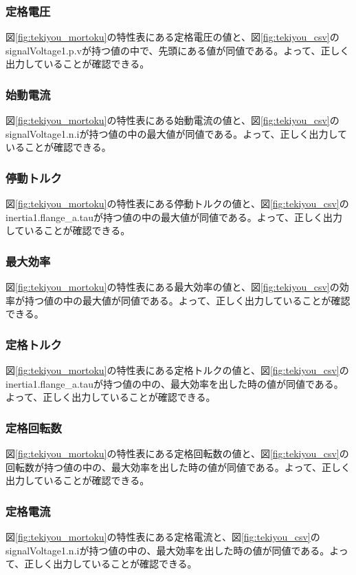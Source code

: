 \subsubsection{定格電圧}
図\ref{fig:tekiyou_mortoku}の特性表にある定格電圧の値と、図\ref{fig:tekiyou_csv}のsignalVoltage1.p.vが持つ値の中で、先頭にある値が同値である。よって、正しく出力していることが確認できる。
\subsubsection{始動電流}
図\ref{fig:tekiyou_mortoku}の特性表にある始動電流の値と、図\ref{fig:tekiyou_csv}のsignalVoltage1.n.iが持つ値の中の最大値が同値である。よって、正しく出力していることが確認できる。
\subsubsection{停動トルク}
図\ref{fig:tekiyou_mortoku}の特性表にある停動トルクの値と、図\ref{fig:tekiyou_csv}のinertia1.flange\_a.tauが持つ値の中の最大値が同値である。よって、正しく出力していることが確認できる。
\subsubsection{最大効率}
図\ref{fig:tekiyou_mortoku}の特性表にある最大効率の値と、図\ref{fig:tekiyou_csv}の効率が持つ値の中の最大値が同値である。よって、正しく出力していることが確認できる。
\subsubsection{定格トルク}
図\ref{fig:tekiyou_mortoku}の特性表にある定格トルクの値と、図\ref{fig:tekiyou_csv}のinertia1.flange\_a.tauが持つ値の中の、最大効率を出した時の値が同値である。よって、正しく出力していることが確認できる。
\subsubsection{定格回転数}
図\ref{fig:tekiyou_mortoku}の特性表にある定格回転数の値と、図\ref{fig:tekiyou_csv}の回転数が持つ値の中の、最大効率を出した時の値が同値である。よって、正しく出力していることが確認できる。
\subsubsection{定格電流}
図\ref{fig:tekiyou_mortoku}の特性表にある定格電流と、図\ref{fig:tekiyou_csv}のsignalVoltage1.n.iが持つ値の中の、最大効率を出した時の値が同値である。よって、正しく出力していることが確認できる。
